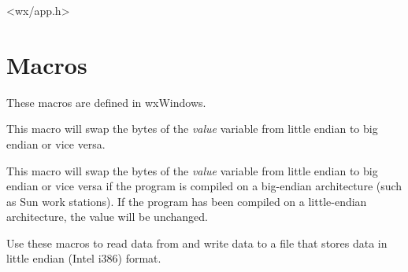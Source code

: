 
<wx/app.h>

\section{Macros}\label{macros}

These macros are defined in wxWindows.

\label{intswapalways}





This macro will swap the bytes of the {\it value} variable from little
endian to big endian or vice versa.

\label{intswaponbe}





This macro will swap the bytes of the {\it value} variable from little
endian to big endian or vice versa if the program is compiled on a
big-endian architecture (such as Sun work stations). If the program has 
been compiled on a little-endian architecture, the value will be unchanged.

Use these macros to read data from and write data to a file that stores 
data in little endian (Intel i386) format.

\label{intswaponle}





